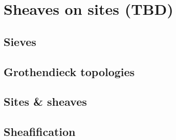 
\section{Sheaves on sites (TBD)}
\subsection{Sieves}
\subsection{Grothendieck topologies}
\subsection{Sites \& sheaves}
\subsection{Sheafification}
